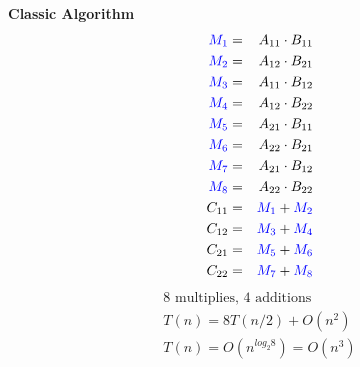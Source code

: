\documentclass[MS]{wfuthesis}
\begin{document}
                    \begin{multicols}{2}
                        \textbf{Classic Algorithm}
                            \begin{eqnarray*}
                                \color{blue} M_1 & = & A_{11}\cdot B_{11} \\
                                \color{blue} M_2 & = & A_{12}\cdot B_{21} \\
                                \color{blue} M_3 & = & A_{11}\cdot B_{12} \\
                                \color{blue} M_4 & = & A_{12}\cdot B_{22} \\
                                \color{blue} M_5 & = & A_{21}\cdot B_{11} \\
                                \color{blue} M_6 & = & A_{22}\cdot B_{21} \\
                                \color{blue} M_7 & = & A_{21}\cdot B_{12} \\
                                \color{blue} M_8 & = & A_{22}\cdot B_{22} \\
                                C_{11} & = & \color{blue} M_1 \color{black} + \color{blue} M_2 \\
                                C_{12} & = & \color{blue} M_3 \color{black} + \color{blue} M_4 \\
                                C_{21} & = & \color{blue} M_5 \color{black} + \color{blue} M_6 \\
                                C_{22} & = & \color{blue} M_7 \color{black} + \color{blue} M_8
                            \end{eqnarray*}
                            \vspace{-40pt}
                            \begin{eqnarray*}
                                \text{8 multiplies, 4 additions} \\
                                T(n) = 8T(n/2) + O(n^2) \\
                                T(n) = O(n^{log_2 8}) = O(n^3)
                            \end{eqnarray*}
                            
                        \columnbreak


\end{multicols}
\end{document}
